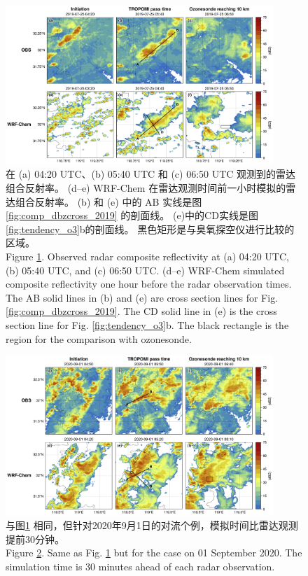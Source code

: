 \begin{figure}[!htbp]
\centering
\includegraphics[width=0.9\textwidth]{./figures/comp_crf_2019.png}
\caption{在 (a) 04:20 UTC、(b) 05:40 UTC 和 (c) 06:50 UTC 观测到的雷达组合反射率。
         (d--e) WRF-Chem 在雷达观测时间前一小时模拟的雷达组合反射率。
         (b) 和 (e) 中的 AB 实线是图 \ref{fig:comp_dbzcross_2019} 的剖面线。
         (e)中的CD实线是图\ref{fig:tendency_o3}b的剖面线。
         黑色矩形是与臭氧探空仪进行比较的区域。\\
         Figure \ref{fig:comp_crf_2019}. Observed radar composite reflectivity at (a) 04:20 UTC, (b) 05:40 UTC, and (c) 06:50 UTC.
        (d--e) WRF-Chem simulated composite reflectivity one hour before the radar observation times.
        The AB solid lines in (b) and (e) are cross section lines for Fig. \ref{fig:comp_dbzcross_2019}.
        The CD solid line in (e) is the cross section line for Fig. \ref{fig:tendency_o3}b.
        The black rectangle is the region for the comparison with ozonesonde.}
\label{fig:comp_crf_2019}
\end{figure}

\begin{figure}[!htbp]
\centering
\includegraphics[width=0.9\textwidth]{./figures/comp_crf_2020.png}
\caption{与图\ref{fig:comp_crf_2019} 相同，但针对2020年9月1日的对流个例，模拟时间比雷达观测提前30分钟。\\
Figure \ref{fig:comp_crf_2020}. Same as Fig. \ref{fig:comp_crf_2019} but for the case on 01 September 2020.
The simulation time is 30 minutes ahead of each radar observation.}
\label{fig:comp_crf_2020}
\end{figure}


